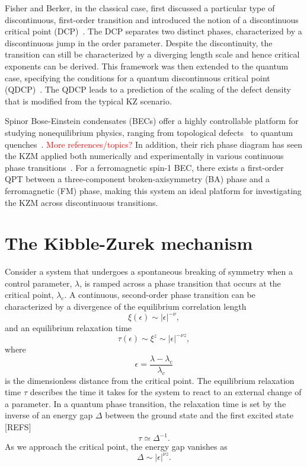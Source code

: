 Fisher and Berker, in the classical case, first discussed a particular type of
discontinuous, first-order transition and introduced the notion of a
discontinuous critical point (DCP)~\cite{Fisher1982}.
The DCP separates two distinct phases, characterized by a discontinuous jump
in the order parameter.
Despite the discontinuity, the transition can still be characterized by a
diverging length scale and hence critical exponents can be derived.
This framework was then extended to the quantum case, specifying the conditions
for a quantum discontinuous critical point (QDCP)~\cite{Suzuki2015}.
The QDCP leads to a prediction of the scaling of the defect density that is
modified from the typical KZ scenario.


Spinor Bose-Einstein condensates (BECs) offer a highly controllable platform
for studying nonequilibrium physics, ranging from topological
defects~\cite{Lovegrove2014, Borgh2016} to quantum
quenches~\cite{Symes2017, Prufer2018, Schmied2019}.
\textcolor{red}{More references/topics?}
In addition, their rich phase diagram has seen the KZM applied both numerically
and experimentally in various continuous phase transitions~\cite{Damski2007,
Saito2007A, Saito2007B, Swislocki2013, Witkowska2013, Anquez2016}.
For a ferromagnetic spin-1 BEC, there exists a first-order QPT between a
three-component broken-axisymmetry (BA) phase and a ferromagnetic (FM) phase,
making this system an ideal platform for investigating the KZM across
discontinuous transitions.


\section{The Kibble-Zurek mechanism}\label{sec:the-KZM}
Consider a system that undergoes a spontaneous breaking of symmetry when a
control parameter, \( \lambda \), is ramped across a phase transition that occurs
at the critical point, \( \lambda_c \).
A continuous, second-order phase transition can be characterized by a divergence
of the equilibrium correlation length
\begin{equation}
    \xi(\epsilon) \sim |\epsilon|^{-\nu},
\end{equation}
and an equilibrium relaxation time
\begin{equation}
    \tau(\epsilon) \sim \xi^z \sim |\epsilon|^{-\nu z},
    \label{eq: equil-relax-time}
\end{equation}
where
\begin{equation}
    \epsilon = \frac{\lambda - \lambda_c}{\lambda_c}
\end{equation}
is the dimensionless distance from the critical point.
The equilibrium relaxation time \( \tau \) describes the time it takes for the
system to react to an external change of a parameter.
In a quantum phase transition, the relaxation time is set by the inverse of an
energy gap \( \Delta \) between the ground state and the first excited state [REFS]
\begin{equation}
    \tau \simeq \Delta^{-1}.
\end{equation}
As we approach the critical point, the energy gap vanishes as
\begin{equation}
    \Delta \sim |\epsilon|^{\nu z}.
\end{equation}


